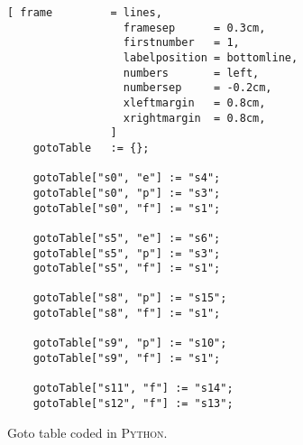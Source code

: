 \begin{figure}[!ht]
\centering
\begin{Verbatim}[ frame         = lines, 
                  framesep      = 0.3cm, 
                  firstnumber   = 1,
                  labelposition = bottomline,
                  numbers       = left,
                  numbersep     = -0.2cm,
                  xleftmargin   = 0.8cm,
                  xrightmargin  = 0.8cm,
                ]
    gotoTable   := {};

    gotoTable["s0", "e"] := "s4";
    gotoTable["s0", "p"] := "s3";
    gotoTable["s0", "f"] := "s1";
    
    gotoTable["s5", "e"] := "s6";
    gotoTable["s5", "p"] := "s3";
    gotoTable["s5", "f"] := "s1";
    
    gotoTable["s8", "p"] := "s15";
    gotoTable["s8", "f"] := "s1";
    
    gotoTable["s9", "p"] := "s10";
    gotoTable["s9", "f"] := "s1";
    
    gotoTable["s11", "f"] := "s14";
    gotoTable["s12", "f"] := "s13";
\end{Verbatim}
\vspace*{-0.3cm}
\caption{Goto table coded in \textsc{Python}.}
\label{fig:parse-table.stlx:goto}
\end{figure}


